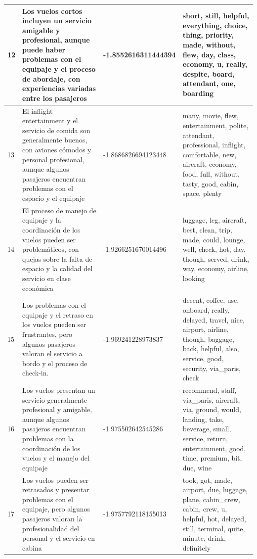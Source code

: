 \documentclass{report}
\begin{document}
\begin{longtable}{|p{1cm}|p{4cm}|p{4cm}|p{6cm}|}
                    \hline
                    12 & Los vuelos cortos incluyen un servicio amigable y profesional, aunque puede haber problemas con el equipaje y el proceso de abordaje, con experiencias variadas entre los pasajeros & -1.8552616311444394 & short, still, helpful, everything, choice, thing, priority, made, without, flew, day, class, economy, u, really, despite, board, attendant, one, boarding \\
                    \hline
                    13 & El inflight entertainment y el servicio de comida son generalmente buenos, con aviones cómodos y personal profesional, aunque algunos pasajeros encuentran problemas con el espacio y el equipaje & -1.8686826694123448 & many, movie, flew, entertainment, polite, attendant, professional, inflight, comfortable, new, aircraft, economy, food, full, without, tasty, good, cabin, space, plenty \\
                    \hline
                    14 & El proceso de manejo de equipaje y la coordinación de los vuelos pueden ser problemáticos, con quejas sobre la falta de espacio y la calidad del servicio en clase económica & -1.9266251670014496 & luggage, leg, aircraft, best, clean, trip, made, could, lounge, well, check, hot, day, though, served, drink, way, economy, airline, looking \\
                    \hline
                    15 & Los problemas con el equipaje y el retraso en los vuelos pueden ser frustrantes, pero algunos pasajeros valoran el servicio a bordo y el proceso de check-in. & -1.969241228973837 & decent, coffee, use, onboard, really, delayed, travel, nice, airport, airline, though, baggage, back, helpful, also, service, good, security, via\_paris, check \\
                    \hline
                    16 & Los vuelos presentan un servicio generalmente profesional y amigable, aunque algunos pasajeros encuentran problemas con la coordinación de los vuelos y el manejo del equipaje & -1.975502642545286 & recommend, staff, via\_paris, aircraft, via, ground, would, landing, take, beverage, small, service, return, entertainment, good, time, premium, bit, due, wine \\
                    \hline
                    17 & Los vuelos pueden ser retrasados y presentar problemas con el equipaje, pero algunos pasajeros valoran la profesionalidad del personal y el servicio en cabina & -1.9757792118155013 & took, got, made, airport, due, luggage, plane, cabin\_crew, cabin, crew, u, helpful, hot, delayed, still, terminal, quite, minute, drink, definitely \\

\end{longtable}
\end{document}
